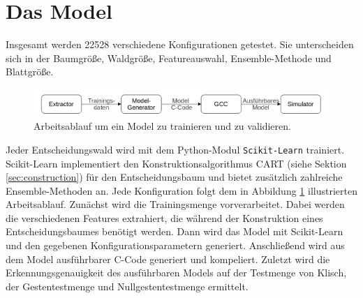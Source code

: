 \section{Das Model}
Insgesamt werden 22528 verschiedene Konfigurationen getestet. Sie unterscheiden sich in der Baumgröße, Waldgröße, Featureauswahl, Ensemble-Methode und Blattgröße.
\newline
\begin{figure}
    \centering
    \includegraphics[width=\linewidth]{images/model_workflow.jpg}
    \caption{Arbeitsablauf um ein Model zu trainieren und zu validieren.}
    \label{fig:model_workflow}
\end{figure}
\newline
Jeder Entscheidungswald wird mit dem Python-Modul \texttt{Scikit-Learn} trainiert. Scikit-Learn implementiert den Konstruktionsalgorithmus CART (siehe Sektion \ref{sec:construction}) für den Entscheidungsbaum und bietet
zusätzlich zahlreiche Ensemble-Methoden an. Jede Konfiguration folgt dem in Abbildung \ref{fig:model_workflow} illustrierten Arbeitsablauf.
\newline
\newline
Zunächst wird die Trainingsmenge vorverarbeitet. Dabei werden die verschiedenen
Features extrahiert, die während der Konstruktion eines Entscheidungsbaumes benötigt werden. Dann wird das Model mit Scikit-Learn und den gegebenen Konfigurationsparametern generiert. Anschließend wird aus dem Model
ausführbarer C-Code generiert und kompeliert. Zuletzt wird die Erkennungsgenauigkeit des ausführbaren Models auf der Testmenge von Klisch, der Gestentestmenge und Nullgestentestmenge ermittelt.

